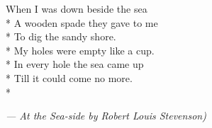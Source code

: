 \newpage

\begin{center}

When I was down beside the sea \\*
A wooden spade they gave to me \\*
To dig the sandy shore. \\*
My holes were empty like a cup. \\*
In every hole the sea came up \\*
Till it could come no more. \\*
\vspace{3mm}

\centerline{\textit{--- 
At the Sea-side
by Robert Louis Stevenson)}} 

\end{center}
\newpage

